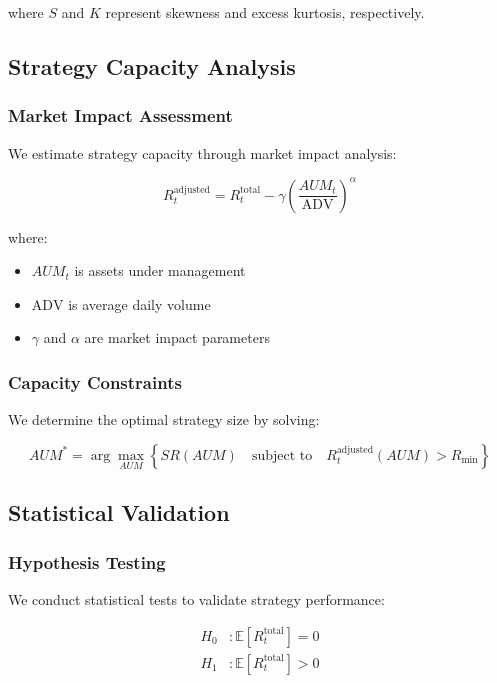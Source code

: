 where $S$ and $K$ represent skewness and excess kurtosis, respectively.

\subsection{Strategy Capacity Analysis}

\subsubsection{Market Impact Assessment}
We estimate strategy capacity through market impact analysis:

\begin{equation}
    R_t^{\text{adjusted}} = R_t^{\text{total}} - \gamma\left(\frac{AUM_t}{\text{ADV}}\right)^\alpha
\end{equation}

where:
\begin{itemize}
    \item $AUM_t$ is assets under management
    \item $\text{ADV}$ is average daily volume
    \item $\gamma$ and $\alpha$ are market impact parameters
\end{itemize}

\subsubsection{Capacity Constraints}
We determine the optimal strategy size by solving:

\begin{equation}
    {AUM}^* = \arg\max_{AUM} \left\{SR(AUM) \quad \text{subject to} \quad R_t^{\text{adjusted}}(AUM) > R_{\text{min}}\right\}
\end{equation}

\subsection{Statistical Validation}

\subsubsection{Hypothesis Testing}
We conduct statistical tests to validate strategy performance:

\begin{equation}
\begin{aligned}
    H_0&: \mathbb{E}[R_t^{\text{total}}] = 0 \\
    H_1&: \mathbb{E}[R_t^{\text{total}}] > 0
\end{aligned}
\end{equation}

